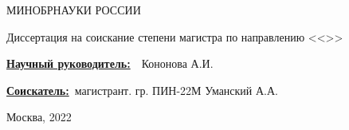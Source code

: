 \begin{frame}
    \begin{center}
        МИНОБРНАУКИ РОССИИ \\
        \thesisOrganization

        \justify{\textbf{\large \thesisTitle}}
        \newline

        Диссертация на соискание степени магистра по направлению \thesisSpecialtyNumber <<\thesisSpecialtyTitle>>

    \end{center}

    \underline{\textbf{Научный руководитель:}}~\supervisorRegaliaShort~Кононова А.И.

    \underline{\textbf{Соискатель:}}~магистрант. гр. ПИН-22М Уманский А.А.

    \begin{center}
        Москва, 2022
    \end{center}

\end{frame}
